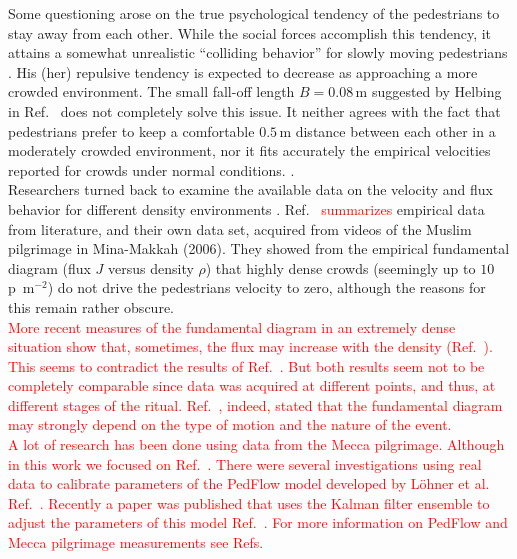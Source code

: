 \documentclass[preprint,12pt]{elsarticle}
\begin{document}
Some questioning arose on the true psychological tendency of the pedestrians to 
stay away from each other. While the social forces accomplish this tendency, it 
attains a somewhat unrealistic ``colliding behavior'' for slowly moving 
pedestrians \cite{Lakoba}. His (her) repulsive tendency is expected to decrease 
as approaching a more crowded environment. The small fall-off length $B=0.08\,$m 
suggested by Helbing in Ref.~\cite{Helbing1} does not completely solve this 
issue. It neither agrees with the fact that pedestrians prefer to keep a 
comfortable $0.5\,$m distance between each other in a moderately crowded 
environment, nor it fits accurately the empirical velocities reported for 
crowds under normal conditions. \cite{Lakoba}.  \\

Researchers turned back to examine the available data on the velocity and flux 
behavior for different density environments \cite{Boltes,helbing3,seyfried1,seyfried}. 
Ref.~\cite{helbing3} \textcolor{red}{summarizes} empirical data from 
literature, and their own data set, acquired from videos of the Muslim 
pilgrimage in Mina-Makkah (2006). They showed from the empirical fundamental 
diagram (flux $J$ versus density $\rho$) that highly dense crowds (seemingly up 
to $10\,$p~m$^{-2}$) do not drive the pedestrians velocity to zero, although the 
reasons for this remain rather obscure.   \\

\textcolor{red}{More recent measures of the fundamental diagram in an extremely dense
 situation show that, sometimes, the flux may increase with the density (Ref.~\cite{lohner1}). 
This seems to contradict the results of Ref.~\cite{helbing3}. But both results seem 
not to be completely  comparable since data was acquired at different points, and thus,
at different stages of the ritual. Ref.~\cite{lohner1}, indeed, stated that the fundamental 
diagram may strongly depend on the type of motion and the nature of the event.}\\

\textcolor{red}{A lot of research has been done using data from the Mecca pilgrimage.
Although in this work we focused on Ref.~\cite{helbing3}. There were several investigations 
using real data to calibrate parameters of the PedFlow model developed by 
L\"ohner et al. Ref.~\cite{lohner2}. Recently a paper was published that uses 
the Kalman filter ensemble to adjust the parameters of this model Ref.~\cite{Togashi1}. 
For more information on PedFlow and Mecca pilgrimage measurements
see Refs.~\cite{Boltes,Dridi1,Dridi2,Baqui1,lohner1} }\\
\end{document}
